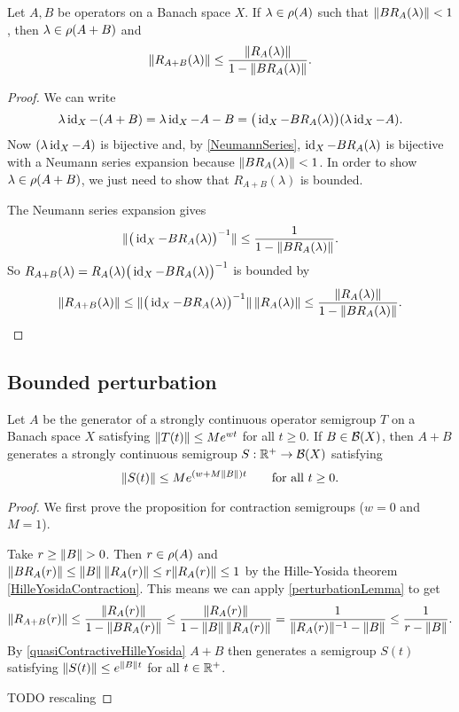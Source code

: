 \begin{lemma} \label{perturbationLemma}
Let $A, B$ be operators on a Banach space $X$. If $\lambda\in\rho(A)$ such that $\lVert BR_A(\lambda)\rVert < 1$, then $\lambda\in \rho(A+B)$ and
\[ \lVert R_{A+B}(\lambda)\rVert \leq \frac{\lVert R_A(\lambda)\rVert}{1- \lVert BR_A(\lambda)\rVert}. \]
\end{lemma}
\begin{proof}
We can write
\[ \lambda\operatorname{id}_X - (A+B) = \lambda\operatorname{id}_X - A-B = \big(\operatorname{id}_X - BR_A(\lambda)\big)(\lambda\operatorname{id}_X - A). \]
Now $(\lambda\operatorname{id}_X - A)$ is bijective and, by \ref{NeumannSeries}, $\operatorname{id}_X - BR_A(\lambda)$ is bijective with a Neumann series expansion because $\lVert BR_A(\lambda)\rVert < 1$. In order to show $\lambda\in\rho(A+B)$, we just need to show that $R_{A+B}(\lambda)$ is bounded.

The Neumann series expansion gives
\[ \lVert\big(\operatorname{id}_X - BR_A(\lambda)\big)^{-1}\rVert \leq \frac{1}{1-\lVert BR_A(\lambda)\rVert}. \]
So $R_{A+B}(\lambda) = R_A(\lambda)\big(\operatorname{id}_X - BR_A(\lambda)\big)^{-1}$ is bounded by
\[ \lVert R_{A+B}(\lambda)\rVert \leq \lVert\big(\operatorname{id}_X - BR_A(\lambda)\big)^{-1}\rVert\,\lVert R_A(\lambda)\rVert \leq \frac{\lVert R_A(\lambda)\rVert}{1-\lVert BR_A(\lambda)\rVert}. \]
\end{proof}

\subsection{Bounded perturbation}
\begin{proposition}
Let $A$ be the generator of a strongly continuous operator semigroup $T$ on a Banach space $X$ satisfying $\lVert T(t)\rVert\leq Me^{wt}$ for all $t\geq 0$. If $B\in \operatorname{\mathcal{B}}(X)$, then $A+B$ generates a strongly continuous semigroup $S: \mathbb{R}^+\to \operatorname{\mathcal{B}}(X)$ satisfying
\[ \lVert S(t)\rVert \leq Me^{(w+M\lVert B\rVert)t} \qquad \text{for all $t\geq 0$.} \]
\end{proposition}
\begin{proof}
We first prove the proposition for contraction semigroups ($w=0$ and $M = 1$).

Take $r \geq \lVert B\rVert > 0$. Then $r\in\rho(A)$ and $\lVert BR_A(r)\rVert \leq \lVert B\rVert\,\lVert R_A(r)\rVert \leq r \lVert R_A(r)\rVert \leq 1$ by the Hille-Yosida theorem \ref{HilleYosidaContraction}. This means we can apply \ref{perturbationLemma} to get
\[ \lVert R_{A+B}(r)\rVert \leq \frac{\lVert R_A(r)\rVert}{1- \lVert BR_A(r)\rVert} \leq \frac{\lVert R_A(r)\rVert}{1- \lVert B\rVert\,\lVert R_A(r)\rVert} = \frac{1}{\lVert R_A(r)\rVert^{-1} - \lVert B\rVert} \leq \frac{1}{r - \lVert B\rVert}. \]
By \ref{quasiContractiveHilleYosida} $A+B$ then generates a semigroup $S(t)$ satisfying $\lVert S(t)\rVert \leq e^{\lVert B\rVert t}$ for all $t\in\mathbb{R}^+$.

TODO rescaling
\end{proof}


